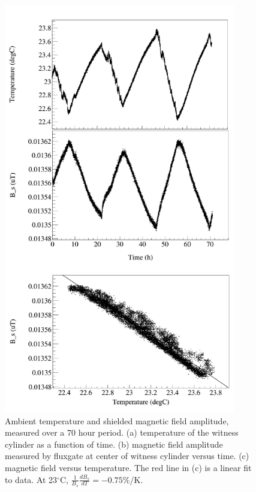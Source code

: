 \begin{figure}
  \begin{center}
    \includegraphics[width=0.9\textwidth]{B_vs_T_solenoid.pdf}
    \caption{Ambient temperature and shielded magnetic field
      amplitude, measured over a 70 hour period. (a) temperature of
      the witness cylinder as a function of time.  (b) magnetic field
      amplitude measured by fluxgate at center of witness cylinder
      versus time.  (c) magnetic field versus temperature. The red
      line in (c) is a linear fit to data. At 23$^\circ$C,
      $\frac{1}{B_s}\frac{dB_s}{dT}=-0.75\%$/K.}
    \label{fig:B_vs_Temp}
  \end{center}
\end{figure} 


